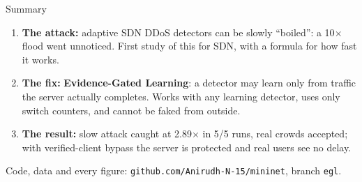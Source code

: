 \documentclass[aspectratio=169,11pt]{beamer}
\newcommand{\key}[1]{\textcolor{gate}{\textbf{#1}}}
\newcommand{\aside}[1]{{\small\color{muted}#1}}
\begin{document}
\begin{frame}{Summary}
\begin{enumerate}\setlength\itemsep{3mm}
\item \textbf{The attack:} adaptive SDN DDoS detectors can be slowly ``boiled'': a 10$\times$ flood
      went unnoticed. First study of this for SDN, with a formula for how fast it works.
\item \textbf{The fix:} \key{Evidence-Gated Learning}: a detector may learn only from traffic the
      server actually completes. Works with any learning detector, uses only switch counters,
      and cannot be faked from outside.
\item \textbf{The result:} slow attack caught at 2.89$\times$ in 5/5 runs, real crowds accepted;
      with verified-client bypass the server is protected and real users see no delay.
\end{enumerate}
\vspace{5mm}
\aside{Code, data and every figure: \texttt{github.com/Anirudh-N-15/mininet}, branch \texttt{egl}.}
\end{frame}
\end{document}
